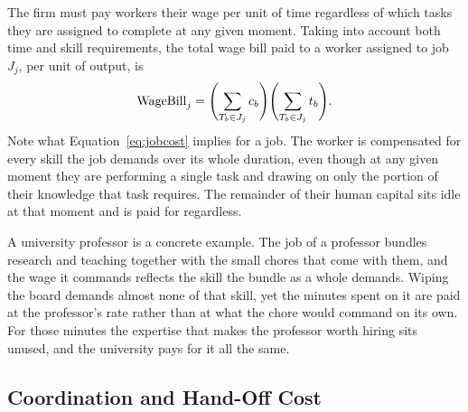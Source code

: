 The firm must pay workers their wage per unit of time regardless of which tasks they are assigned to complete at any given moment.
Taking into account both time and skill requirements, the total wage bill paid to a worker assigned to job $J_j$, per unit of output, is
\begin{align}
\label{eq:jobcost}
\text{WageBill}_j = \Biggl(\sum_{T_b \in J_j} c_{b} \Biggr)\Biggl(\sum_{T_b \in J_j} t_{b} \Biggr).
\end{align}
Note what Equation~\eqref{eq:jobcost} implies for a job.
The worker is compensated for every skill the job demands over its whole duration, even though at any given moment they are performing a single task and drawing on only the portion of their knowledge that task requires.
The remainder of their human capital sits idle at that moment and is paid for regardless.

A university professor is a concrete example.
The job of a professor bundles research and teaching together with the small chores that come with them, and the wage it commands reflects the skill the bundle as a whole demands.
Wiping the board demands almost none of that skill, yet the minutes spent on it are paid at the professor's rate rather than at what the chore would command on its own.
For those minutes the expertise that makes the professor worth hiring sits unused, and the university pays for it all the same.

\subsection{Coordination and Hand-Off Cost}
\label{sec:longrun.handoff}

